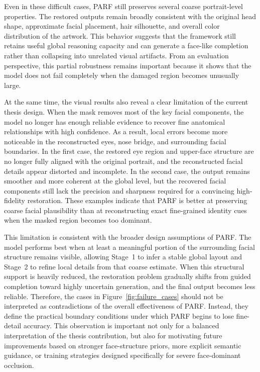 \documentclass[12pt, twoside]{report}
\begin{document}
Even in these difficult cases, PARF still preserves several coarse portrait-level properties. The restored outputs remain broadly consistent with the original head shape, approximate facial placement, hair silhouette, and overall color distribution of the artwork. This behavior suggests that the framework still retains useful global reasoning capacity and can generate a face-like completion rather than collapsing into unrelated visual artifacts. From an evaluation perspective, this partial robustness remains important because it shows that the model does not fail completely when the damaged region becomes unusually large.

At the same time, the visual results also reveal a clear limitation of the current thesis design. When the mask removes most of the key facial components, the model no longer has enough reliable evidence to recover fine anatomical relationships with high confidence. As a result, local errors become more noticeable in the reconstructed eyes, nose bridge, and surrounding facial boundaries. In the first case, the restored eye region and upper-face structure are no longer fully aligned with the original portrait, and the reconstructed facial details appear distorted and incomplete. In the second case, the output remains smoother and more coherent at the global level, but the recovered facial components still lack the precision and sharpness required for a convincing high-fidelity restoration. These examples indicate that PARF is better at preserving coarse facial plausibility than at reconstructing exact fine-grained identity cues when the masked region becomes too dominant.

This limitation is consistent with the broader design assumptions of PARF. The model performs best when at least a meaningful portion of the surrounding facial structure remains visible, allowing Stage~1 to infer a stable global layout and Stage~2 to refine local details from that coarse estimate. When this structural support is heavily reduced, the restoration problem gradually shifts from guided completion toward highly uncertain generation, and the final output becomes less reliable. Therefore, the cases in Figure~\ref{fig:failure_cases} should not be interpreted as contradictions of the overall effectiveness of PARF. Instead, they define the practical boundary conditions under which PARF begins to lose fine-detail accuracy. This observation is important not only for a balanced interpretation of the thesis contribution, but also for motivating future improvements based on stronger face-structure priors, more explicit semantic guidance, or training strategies designed specifically for severe face-dominant occlusion.
\end{document}
